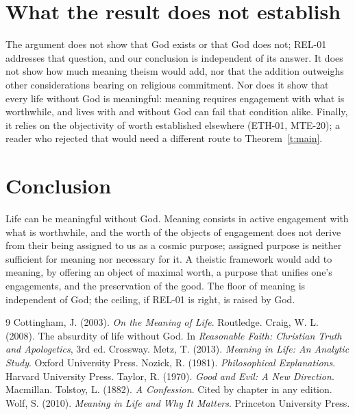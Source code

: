 \documentclass{situationist-preprint}
\begin{document}
\section{What the result does not establish}

The argument does not show that God exists or that God does not; REL-01 addresses that question, and our conclusion is independent of its answer. It does not show how much meaning theism would add, nor that the addition outweighs other considerations bearing on religious commitment. Nor does it show that every life without God is meaningful: meaning requires engagement with what is worthwhile, and lives with and without God can fail that condition alike. Finally, it relies on the objectivity of worth established elsewhere (ETH-01, MTE-20); a reader who rejected that would need a different route to Theorem~\ref{t:main}.

\section{Conclusion}

Life can be meaningful without God. Meaning consists in active engagement with what is worthwhile, and the worth of the objects of engagement does not derive from their being assigned to us as a cosmic purpose; assigned purpose is neither sufficient for meaning nor necessary for it. A theistic framework would add to meaning, by offering an object of maximal worth, a purpose that unifies one's engagements, and the preservation of the good. The floor of meaning is independent of God; the ceiling, if REL-01 is right, is raised by God.

\begin{thebibliography}{9}\small
{} Cottingham, J. (2003). \emph{On the Meaning of Life}. Routledge.
 Craig, W. L. (2008). The absurdity of life without God. In \emph{Reasonable Faith: Christian Truth and Apologetics}, 3rd ed. Crossway.
 Metz, T. (2013). \emph{Meaning in Life: An Analytic Study}. Oxford University Press.
 Nozick, R. (1981). \emph{Philosophical Explanations}. Harvard University Press.
 Taylor, R. (1970). \emph{Good and Evil: A New Direction}. Macmillan.
 Tolstoy, L. (1882). \emph{A Confession}. Cited by chapter in any edition.
 Wolf, S. (2010). \emph{Meaning in Life and Why It Matters}. Princeton University Press.
\end{thebibliography}
\end{document}
